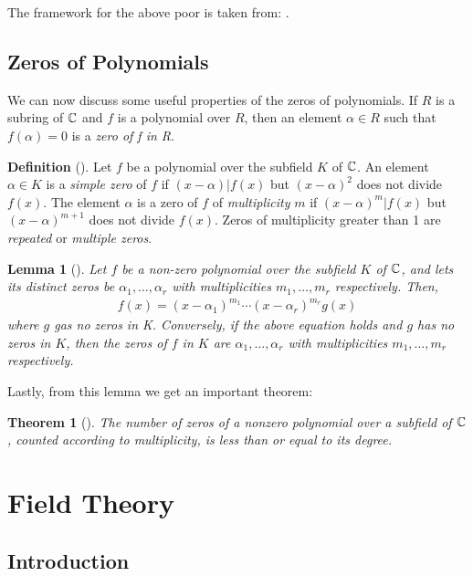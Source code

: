 \documentclass[11pt, a4paper, oneside]{article}
\theoremstyle{plain}
\newtheorem*{thm*}{Theorem}
\theoremstyle{plain}
\theoremstyle{plain}
\newtheorem*{lemma*}{Lemma}
\theoremstyle{plain}
\theoremstyle{definition}
\theoremstyle{example}
\begin{document}
The framework for the above poor is taken from: \cite[\S 3.2, p. 52]{stewart}.

\subsection{Zeros of Polynomials}

We can now discuss some useful properties of the zeros of polynomials. If $R$ is a subring of $\mathbb{C}$ and $f$ is a polynomial over $R$, then an element $\alpha \in R$ such that $f(\alpha) = 0$ is a \textit{zero of f in R}.

\textbf{Definition} (\cite[Definition 3.26]{stewart}). Let $f$ be a polynomial over the subfield $K$ of $\mathbb{C}$. An element $\alpha \in K$ is a \textit{simple zero} of $f$ if $(x - \alpha) | f(x)$ but $(x - \alpha)^2$ does not divide $f(x)$. The element $\alpha$ is a zero of $f$ of \textit{multiplicity} $m$ if $(x - \alpha)^m | f(x)$ but $(x - \alpha)^{m+1}$ does not divide $f(x)$. Zeros of multiplicity greater than 1 are \textit{repeated} or \textit{multiple zeros}.

\begin{lemma*}[{\cite[Lemma\ 3.27]{stewart}}] 
Let $f$ be a non-zero polynomial over the subfield $K$ of $\mathbb{C}$, and lets its distinct zeros be $\alpha_1, \ldots, \alpha_r$ with multiplicities $m_1, \ldots, m_r$ respectively. Then,
\begin{align*}
f(x) = (x - \alpha_1)^{m_1} \cdots (x - \alpha_r)^{m_r}g(x)
\end{align*}
where $g$ gas no zeros in K. Conversely, if the above equation holds and $g$ has no zeros in $K$, then the zeros of $f$ in $K$ are $\alpha_1, \ldots, \alpha_r$ with multiplicities $m_1, \ldots, m_r$ respectively.
\end{lemma*}

Lastly, from this lemma we get an important theorem:

\begin{thm*}[{\cite[Thm.\ 3.28]{stewart}}] 
The number of zeros of a nonzero polynomial over a subfield of $\mathbb{C}$, counted according to multiplicity, is less than or equal to its degree.
\end{thm*}

\section{Field Theory}

\subsection{Introduction}
\end{document}
